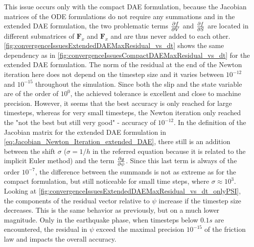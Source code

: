 This issue occurs only with the compact DAE formulation, because the Jacobian matrices of the ODE formulations do not require any summations and in the extended DAE formulation, the two problematic terms $\pdv{f}{V}$ and $\pdv{f}{S}$ are located in different submatrices of $\mathbf{F}_{\dot{x}}$ and $\mathbf{F}_x$ and are thus never added to each other. \autoref{fig:convergenceIssuesExtendedDAEMaxResidual_vs_dt} shows the same dependency as in \autoref{fig:convergenceIssuesCompactDAEMaxResidual_vs_dt} for the extended DAE formulation. The norm of the residual at the end of the Newton iteration here does not depend on the timestep size and it varies between $10^{-12}$ and $10^{-15}$ throughout the simulation. Since both the slip and the state variable are of the order of $10^0$, the achieved tolerance is excellent and close to machine precision. However, it seems that the best accuracy is only reached for large timesteps, whereas for very small timesteps, the Newton iteration only reached the "not the best but still very good" - accuracy of $10^{-12}$. In the definition of the Jacobian matrix for the extended DAE formulation in \autoref{eq:Jacobian_Newton_Iteration_extended_DAE}, there still is an addition between the shift $\sigma$ ($\sigma=1/h$ in the referred equation because it is related to the implicit Euler method) and the term $\pdv{g}{\psi}$. Since this last term is always of the order $10^{-7}$, the difference between the summands is not as extreme as for the compact formulation, but still noticeable for small time steps, where $\sigma \approx 10^3$. Looking at \autoref{fig:convergenceIssuesExtendedDAEMaxResidual_vs_dt_onlyPSI}, the components of the residual vector relative to $\psi$ increase if the timestep size decreases. This is the same behavior as previously, but on a much lower magnitude. Only in the earthquake phase, when timesteps below $0.1s$ are encountered, the residual in $\psi$ exceed the maximal precision $10^{-15}$ of the friction law and impacts the overall accuracy. 

